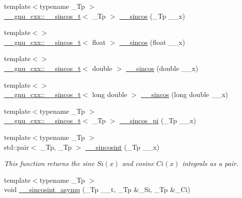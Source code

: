 \begin{DoxyCompactItemize}
{\footnotesize template$<$typename \+\_\+\+Tp $>$ }\\\hyperlink{struct____gnu__cxx_1_1____sincos__t}{\+\_\+\+\_\+gnu\+\_\+cxx\+::\+\_\+\+\_\+sincos\+\_\+t}$<$ \+\_\+\+Tp $>$ \hyperlink{namespacestd_1_1____detail_a59a9ff6922faa1a88da8b485ee9d37cb}{\+\_\+\+\_\+sincos} (\+\_\+\+Tp \+\_\+\+\_\+x)
\item 
{\footnotesize template$<$$>$ }\\\hyperlink{struct____gnu__cxx_1_1____sincos__t}{\+\_\+\+\_\+gnu\+\_\+cxx\+::\+\_\+\+\_\+sincos\+\_\+t}$<$ float $>$ \hyperlink{namespacestd_1_1____detail_a8cfd8b8345ebc359e31ac1631e29aeea}{\+\_\+\+\_\+sincos} (float \+\_\+\+\_\+x)
\item 
{\footnotesize template$<$$>$ }\\\hyperlink{struct____gnu__cxx_1_1____sincos__t}{\+\_\+\+\_\+gnu\+\_\+cxx\+::\+\_\+\+\_\+sincos\+\_\+t}$<$ double $>$ \hyperlink{namespacestd_1_1____detail_a76c185b3a0156ecf557afdbf552a8916}{\+\_\+\+\_\+sincos} (double \+\_\+\+\_\+x)
\item 
{\footnotesize template$<$$>$ }\\\hyperlink{struct____gnu__cxx_1_1____sincos__t}{\+\_\+\+\_\+gnu\+\_\+cxx\+::\+\_\+\+\_\+sincos\+\_\+t}$<$ long double $>$ \hyperlink{namespacestd_1_1____detail_aade98e6318f4459f37e1f79f4c871cf6}{\+\_\+\+\_\+sincos} (long double \+\_\+\+\_\+x)
\item 
{\footnotesize template$<$typename \+\_\+\+Tp $>$ }\\\hyperlink{struct____gnu__cxx_1_1____sincos__t}{\+\_\+\+\_\+gnu\+\_\+cxx\+::\+\_\+\+\_\+sincos\+\_\+t}$<$ \+\_\+\+Tp $>$ \hyperlink{namespacestd_1_1____detail_af17af8caca5ba47597cc314e93ba49cd}{\+\_\+\+\_\+sincos\+\_\+pi} (\+\_\+\+Tp \+\_\+\+\_\+x)
\item 
{\footnotesize template$<$typename \+\_\+\+Tp $>$ }\\std\+::pair$<$ \+\_\+\+Tp, \+\_\+\+Tp $>$ \hyperlink{namespacestd_1_1____detail_a53bf807a99eef68cdb6f917c7ca085bf}{\+\_\+\+\_\+sincosint} (\+\_\+\+Tp \+\_\+\+\_\+x)
\begin{DoxyCompactList}\small\item\em This function returns the sine $ Si(x) $ and cosine $ Ci(x) $ integrals as a {\ttfamily pair}. \end{DoxyCompactList}\item 
{\footnotesize template$<$typename \+\_\+\+Tp $>$ }\\void \hyperlink{namespacestd_1_1____detail_a976c3ff52c54001de3d409900c9bcb9c}{\+\_\+\+\_\+sincosint\+\_\+asymp} (\+\_\+\+Tp \+\_\+\+\_\+t, \+\_\+\+Tp \&\+\_\+\+Si, \+\_\+\+Tp \&\+\_\+\+Ci)

\end{DoxyCompactItemize}
